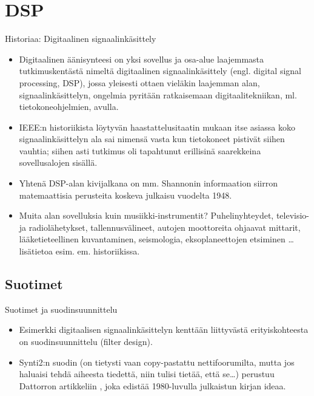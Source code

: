 \documentclass[pdf,9pt,handout]{beamer}
\begin{document}
\section{DSP}
\begin{frame}{Historiaa: Digitaalinen signaalinkäsittely}
  \begin{itemize}
    \item
  Digitaalinen äänisynteesi on yksi sovellus ja osa-alue laajemmasta
  tutkimuskentästä nimeltä digitaalinen signaalinkäsittely
  (engl. digital signal processing, DSP), jossa yleisesti ottaen
  vieläkin laajemman alan, signaalinkäsittelyn, ongelmia pyritään
  ratkaisemaan digitaalitekniikan, ml. tietokoneohjelmien,
  avulla.
\item
  IEEE:n historiikista \cite{nebeker1998signalprocessing} löytyvän
  haastattelusitaatin mukaan itse asiassa koko signaalinkäsittelyn ala
  sai nimensä vasta kun tietokoneet pistivät siihen vauhtia; siihen
  asti tutkimus oli tapahtunut erillisinä saarekkeina sovellusalojen
  sisällä.

\item
  Yhtenä DSP-alan kivijalkana on mm. Shannonin informaation siirron
  matemaattisia perusteita koskeva julkaisu
  \cite{shannon48amathematical} vuodelta 1948.

\item
  Muita alan sovelluksia kuin musiikki-instrumentit? Puhelinyhteydet,
  televisio- ja radiolähetykset, tallennusvälineet, autojen
  moottoreita ohjaavat mittarit, lääketieteellinen kuvantaminen,
  seismologia, eksoplaneettojen etsiminen \ldots lisätietoa esim. em.
  historiikissa.
  \end{itemize}
  
\end{frame}

\subsection{Suotimet}
\begin{frame}{Suotimet ja suodinsuunnittelu}

  \begin{itemize}
    \item
  Esimerkki digitaalisen signaalinkäsittelyn kenttään liittyvästä
  erityiskohteesta on suodinsuunnittelu (filter design).
    \item
  Synti2:n suodin (on tietysti vaan copy-pastattu nettifoorumilta,
  mutta jos haluaisi tehdä aiheesta tiedettä, niin tulisi tietää, että
  se\ldots) perustuu Dattorron artikkeliin \cite{dattorro1997effect},
  joka edistää 1980-luvulla julkaistun kirjan \cite{Chamberlin1980}
  ideaa.
  \end{itemize}

\end{frame}
\end{document}
